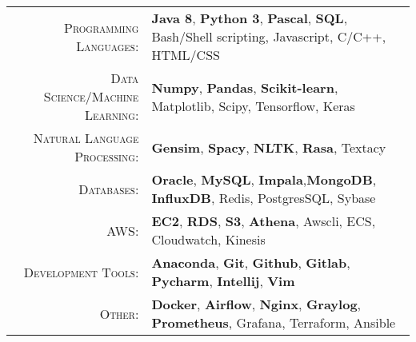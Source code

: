 %
%
%

\renewcommand{\arraystretch}{1.1}
	\begin{tabular}{>{}r>{}p{13cm}} 
		\textsc{Programming Languages:}  		&   \textbf{Java 8}, \textbf{Python 3}, \textbf{Pascal}, \textbf{SQL}, Bash/Shell scripting, Javascript, C/C++, HTML/CSS \\ 
		\textsc{Data Science/Machine Learning:}                  &   \textbf{Numpy}, \textbf{Pandas}, \textbf{Scikit-learn}, Matplotlib, Scipy, Tensorflow, Keras\\
		\textsc{Natural Language Processing:} 	 & \textbf{Gensim}, \textbf{Spacy}, \textbf{NLTK}, \textbf{Rasa}, Textacy\\
		\textsc{Databases:}                  &   \textbf{Oracle}, \textbf{MySQL}, \textbf{Impala},\textbf{MongoDB}, \textbf{InfluxDB}, Redis, PostgresSQL, Sybase \\ 		
		\textsc{AWS:}                  &   \textbf{EC2}, \textbf{RDS}, \textbf{S3}, \textbf{Athena}, Awscli, ECS, Cloudwatch, Kinesis \\ 
		\textsc{Development Tools:} & 	  		\textbf{Anaconda}, \textbf{Git}, \textbf{Github}, \textbf{Gitlab}, \textbf{Pycharm}, \textbf{Intellij}, \textbf{Vim}  \\		
		\textsc{Other:}  &                       \textbf{Docker}, \textbf{Airflow}, \textbf{Nginx}, \textbf{Graylog}, \textbf{Prometheus}, Grafana, Terraform, Ansible \\

	\end{tabular}